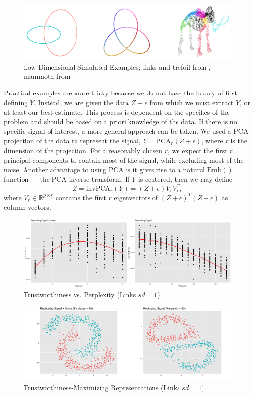 \documentclass{article}
\begin{document}
\renewcommand{\thefigure}{2}
\begin{figure}[b]
\centering
\includegraphics[scale=0.5]{simulated_examples}
\caption{Low-Dimensional Simulated Examples; links and trefoil from \cite{Distill}, mammoth from \cite{understanding DR}}
\end{figure}

Practical examples are more tricky because we do not have the luxury of first defining $Y$. Instead, we are given the data $Z + \epsilon$ from which we must extract $Y$, or at least our best estimate. This process is dependent on the specifics of the problem and should be based on a priori knowledge of the data. If there is no specific signal of interest, a more general approach can be taken. We used a PCA projection of the data to represent the signal, $Y = \textrm{PCA}_r(Z + \epsilon)$, where $r$ is the dimension of the projection. For a reasonably chosen $r$, we expect the first $r$ principal components to contain most of the signal, while excluding most of the noise. Another advantage to using PCA is it gives rise to a natural $\textrm{Emb}()$ function --- the PCA inverse transform. If $Y$ is centered, then we may define $$Z = \textrm{invPCA}_r(Y) = (Z + \epsilon)V_rV_r^T,$$ where $V_r \in \mathbb{R}^{p \times r}$ contains the first $r$ eigenvectors of $(Z+\epsilon)^T(Z+\epsilon)$ as column vectors.

\renewcommand{\thefigure}{3}
\begin{figure}[t]
\centering
\includegraphics[scale=0.22]{trust_plot_links}
\caption{Trustworthiness vs. Perplexity (Links $sd = 1$)}
\end{figure}

\renewcommand{\thefigure}{4}
\begin{figure}[b]
\centering
\includegraphics[scale=0.26]{best_rep_links}
\caption{Trustworthiness-Maximizing Representations (Links $sd = 1$)}
\end{figure}
\end{document}
